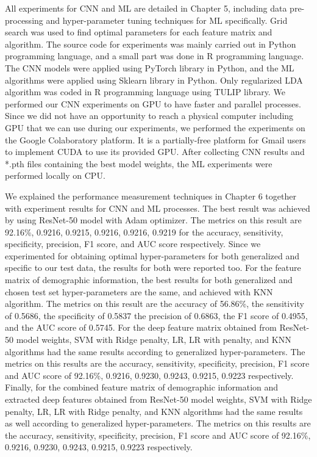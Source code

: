 All experiments for CNN and ML are detailed in Chapter 5, including data pre-processing and hyper-parameter tuning techniques for ML specifically. Grid search was used to find optimal parameters for each feature matrix and algorithm. The source code for experiments was mainly carried out in Python programming language, and a small part was done in R programming language. The CNN models were applied using PyTorch library in Python, and the ML algorithms were applied using Sklearn library in Python. Only regularized LDA algorithm was coded in R programming language using TULIP library. We performed our CNN experiments on GPU to have faster and parallel processes. Since we did not have an opportunity to reach a physical computer including GPU that we can use during our experiments, we performed the experiments on the Google Colaboratory platform. It is a partially-free platform for Gmail users to implement CUDA to use its provided GPU. After collecting CNN results and *.pth files containing the best model weights, the ML experiments were performed locally on CPU.

We explained the performance measurement techniques in Chapter 6 together with experiment results for CNN and ML processes. The best result was achieved by using ResNet-50 model with Adam optimizer. The metrics on this result are 92.16\%, 0.9216, 0.9215, 0.9216, 0.9216, 0.9219 for the accuracy, sensitivity, specificity, precision, F1 score, and AUC score respectively. Since we experimented for obtaining optimal hyper-parameters for both generalized and specific to our test data, the results for both were reported too. For the feature matrix of demographic information, the best results for both generalized and chosen test set hyper-parameters are the same, and achieved with KNN algorithm. The metrics on this result are the accuracy of 56.86\%, the sensitivity of 0.5686, the specificity of 0.5837 the precision of 0.6863, the F1 score of 0.4955, and the AUC score of 0.5745. For the deep feature matrix obtained from ResNet-50 model weights, SVM with Ridge penalty, LR, LR with penalty, and KNN algorithms had the same results according to generalized hyper-parameters. The metrics on this results are the accuracy, sensitivity, specificity, precision, F1 score and AUC score of 92.16\%, 0.9216, 0.9230, 0.9243, 0.9215, 0.9223 respectively. Finally, for the combined feature matrix of demographic information and extracted deep features obtained from ResNet-50 model weights, SVM with Ridge penalty, LR, LR with Ridge penalty, and KNN algorithms had the same results as well according to generalized hyper-parameters. The metrics on this results are the accuracy, sensitivity, specificity, precision, F1 score and AUC score of 92.16\%, 0.9216, 0.9230, 0.9243, 0.9215, 0.9223 respectively.


